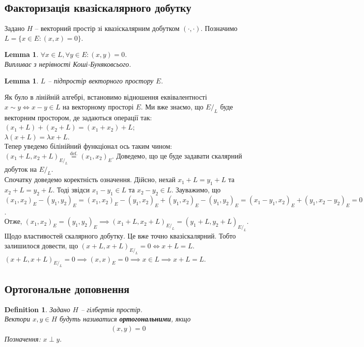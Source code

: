 \documentclass[a4paper, 10pt]{article}
\theoremstyle{theoremdd}
\theoremstyle{theoremdd}
\newtheorem{definition}[theorem]{Definition}
\theoremstyle{theoremdd}
\theoremstyle{theoremdd}
\theoremstyle{theoremdd}
\theoremstyle{theoremdd}
\theoremstyle{theoremdd}
\newtheorem{lemma}[theorem]{Lemma}
\theoremstyle{theoremdd}
\begin{document}
\subsection{Факторизація квазіскалярного добутку}
Задано $H$ -- векторний простір зі квазіскалярним добутком $(\cdot,\cdot)$. Позначимо $L = \{x \in E: (x,x) = 0\}$.

\begin{lemma}
$\forall x \in L, \forall y \in E: (x,y) = 0$.\\
\textit{Випливає з нерівності Коші-Буняковсього}.
\end{lemma}

\begin{lemma}
$L$ -- підпростір векторного простору $E$.
\end{lemma}
\noindent
Як було в лінійній алгебрі, встановимо відношення еквівалентності $x \sim y \iff x - y \in L$ на векторному просторі $E$. Ми вже знаємо, що $E/_L$ буде векторним простором, де задаються операції так:\\
$(x_1+L) + (x_2+L) = (x_1+x_2) + L$;\\
$\lambda(x+L) = \lambda x + L$.\\
Тепер уведемо білінійний функціонал ось таким чином: $(x_1+L,x_2+L)_{E/_L} \overset{\text{def.}}{=} (x_1,x_2)_E$. Доведемо, що це буде задавати скалярний добуток на $E/_L$.\\
Спочатку доведемо коректність означення. Дійсно, нехай $x_1+L = y_1+L$ та $x_2+L = y_2+L$. Тоді звідси $x_1-y_1 \in L$ та $x_2-y_2 \in L$. Зауважимо, що\\
$(x_1,x_2)_E - (y_1,y_2)_E = (x_1,x_2)_E - (y_1,x_2)_E + (y_1,x_2)_E - (y_1,y_2)_E = (x_1-y_1,x_2)_E + (y_1,x_2-y_2)_E = 0$.\\
Отже, $(x_1,x_2)_E = (y_1,y_2)_E \implies (x_1+L,x_2+L)_{E/_L} = (y_1+L,y_2+L)_{E/_L}$.\\
Щодо властивостей скалярного добутку. Це вже точно квазіскалярний. Тобто залишилося довести, що $(x+L,x+L)_{E/_L} = 0 \iff x+L = L$.\\
$(x+L,x+L)_{E/_L} = 0 \implies (x,x)_E = 0 \implies x \in L \implies x+L = L$.
 
\subsection{Ортогональне доповнення}
\begin{definition}
Задано $H$ -- гілбертів простір.\\
Вектори $x,y \in H$ будуть називатися \textbf{ортогональними}, якщо
\begin{align*}
(x,y) = 0
\end{align*}
Позначення: $x \perp y$.
\end{definition}
\end{document}
